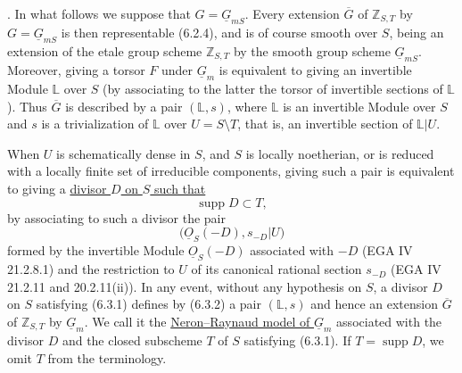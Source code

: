 
\medskip
{}.  In what follows we suppose that
$G=\underline G_{mS}$.  Every extension $\overline G$ of
$\mathbb Z_{S,T}$ by $G=\underline G_{mS}$ is then representable (6.2.4),
and is of course smooth over $S$, being an extension of the etale group
scheme $\mathbb Z_{S,T}$ by the smooth group scheme $\underline G_{mS}$.
Moreover, giving a torsor $F$ under $\underline G_m$ is equivalent to giving
an invertible Module $\mathbb L$ over $S$ (by associating to the latter the
torsor of invertible sections of $\mathbb L$).  Thus $\overline G$ is
described by a pair $(\mathbb L,s)$, where $\mathbb L$ is an invertible
Module over $S$ and $s$ is a trivialization of $\mathbb L$ over
$U=S\setminus T$, that is, an invertible section of $\mathbb L|U$.

When $U$ is schematically dense in $S$, and $S$ is locally noetherian, or is
reduced with a locally finite set of irreducible components, giving such a
pair is equivalent to giving a \underline{divisor $D$ on $S$ such that}
\begin{equation}\tag{6.3.1}
 \operatorname{supp}D\subset T,
\end{equation}
by associating to such a divisor the pair
\begin{equation}\tag{6.3.2}
 \bigl(\underline O_S(-D),s_{-D}|U\bigr)
\end{equation}
formed by the invertible Module $\underline O_S(-D)$ associated with $-D$
(EGA IV 21.2.8.1) and the restriction to $U$ of its canonical rational
section $s_{-D}$ (EGA IV 21.2.11 and 20.2.11(ii)).  In any event, without
any hypothesis on $S$, a divisor $D$ on $S$ satisfying (6.3.1) defines by
(6.3.2) a pair $(\mathbb L,s)$ and hence an extension $\overline G$ of
$\mathbb Z_{S,T}$ by $\underline G_m$.  We call it the
\underline{Neron--Raynaud model of $\underline G_m$} associated with the
divisor $D$ and the closed subscheme $T$ of $S$ satisfying (6.3.1).  If
$T=\operatorname{supp}D$, we omit $T$ from the terminology.

